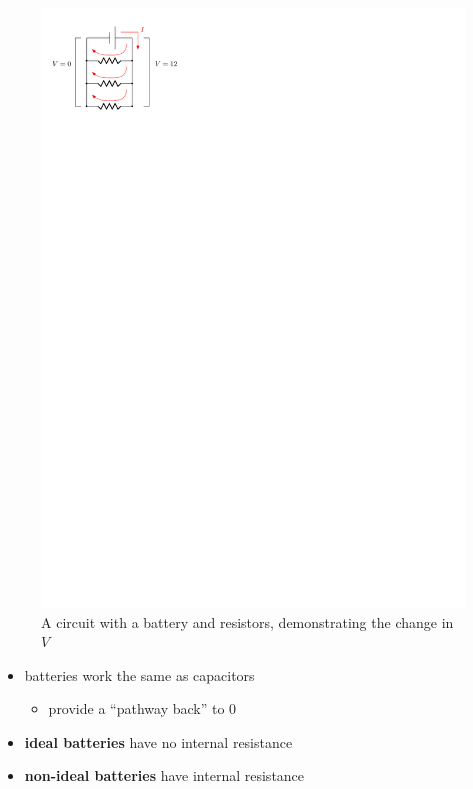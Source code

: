 \documentclass{article}
\begin{document}
\begin{itemize}
\begin{figure}[H]
          \includegraphics{figures/bat-change-v.pdf}
          \caption{A circuit with a battery and resistors, demonstrating the change in $V$}
        \end{figure}
        \begin{itemize}
          \item batteries work the same as capacitors
            \begin{itemize}
              \item provide a ``pathway back'' to $0$
            \end{itemize}
          \item \textbf{ideal batteries} have no internal resistance
          \item \textbf{non-ideal batteries} have internal resistance 
            \begin{figure}[H]
              \centering

\end{figure}
\end{itemize}
\end{itemize}
\end{document}
